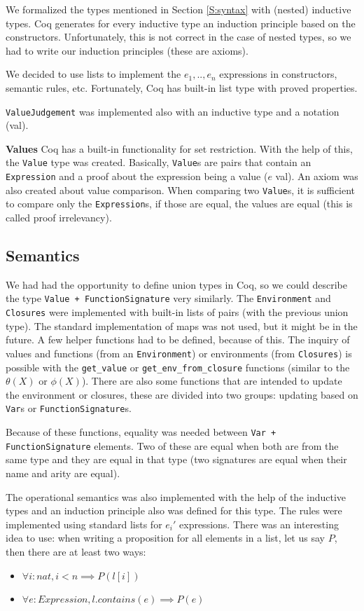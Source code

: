 \documentclass[12pt]{article}
\theoremstyle{definition}
\numberwithin{equation}{section}
\begin{document}
We formalized the types mentioned in Section \ref{S:syntax} with (nested) inductive types. Coq generates for every inductive type an induction principle based on the constructors. Unfortunately, this is not correct in the case of nested types, so we had to write our induction principles (these are axioms).

We decided to use lists to implement the $e_1, .., e_n$ expressions in constructors, semantic rules, etc. Fortunately, Coq has built-in list type with proved properties.

\verb|ValueJudgement| was implemented also with an inductive type and a notation (val).

{\bf Values} Coq has a built-in functionality for set restriction. With the help of this, the \verb|Value| type was created. Basically, \verb|Value|s are pairs that contain an \verb|Expression| and a proof about the expression being a value ($e$ val). An axiom was also created about value comparison. When comparing two \verb|Value|s, it is sufficient to compare only the \verb|Expression|s, if those are equal, the values are equal (this is called proof irrelevancy).

\subsection{Semantics}
\label{S:Semantics}

We had had the opportunity to define union types in Coq, so we could describe the type \verb|Value + FunctionSignature| very similarly. The \verb|Environment| and \verb|Closures| were implemented with built-in lists of pairs (with the previous union type). The standard implementation of maps was not used, but it might be in the future. A few helper functions had to be defined, because of this. The inquiry of values and functions (from an \verb|Environment|) or environments (from \verb|Closures|) is possible with the \verb|get_value| or \verb|get_env_from_closure| functions (similar to the $\theta(X)$ or $\phi(X)$). There are also some functions that are intended to update the environment or closures, these are divided into two groups: updating based on \verb|Var|s or \verb|FunctionSignature|s.

Because of these functions, equality was needed between \verb|Var + FunctionSignature| elements. Two of these are equal when both are from the same type and they are equal in that type (two signatures are equal when their name and arity are equal).

The operational semantics was also implemented with the help of the inductive types and an induction principle also was defined for this type. The rules were implemented using standard lists for $e_i'$ expressions. There was an interesting idea to use: when writing a proposition for all elements in a list, let us say $P$, then there are at least two ways:
\begin{itemize}
	\item $\forall i : nat, i < n \implies P(l[i])$
	\item $\forall e : Expression, l.contains(e) \implies P(e)$
\end{itemize}
\end{document}
